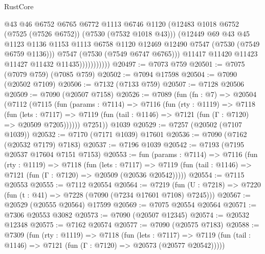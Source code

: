\begin{lexlean}{RustCore}
\begin{coremodule}
                            @43
                            @46
                            @6752
                            @6765
                            @6772
                            @1113
                            @6746
                            @1120
                            (@12483 @1018 @6752 (@7525 (@7526 @6752)) (@7530 (@7532 @1018 @43)))
                            (@12449
                              @69
                              @43
                              @45
                              @1123
                              @1136
                              @1153
                              @1113
                              @6758
                              @1120
                              @12469
                              @12490
                              @7547
                              (@7530 (@7549 @6759 @1136)))
                            @7547
                            (@7530 (@7549 @6747 @6765)))
                          @11417
                          @11420
                          @11423
                          @11427
                          @11432
                          @11435)))))))))))
@20497 := @7073 @759
@20501 := @7075 (@7079 @759) (@7085 @759)
@20502 := @7094 @17598
@20504 := @7090 (@20502 @7109)
@20506 := @7132 (@7133 @759)
@20507 := @7128 @20506
@20509 := @7090 (@20507 @7158)
@20526 := @7089
    (fun (fn : @7) =>
    @20504
      (@7112
        (@7115
          (fun (params : @7114) =>
          @7116
            (fun (rty : @1119) =>
            @7118
              (fun (lets : @7117) =>
              @7119 (fun (tail : @1146) => @7121 (fun (Γ : @7120) => @20509 @7205))))))
        @7251))
    @1039
@20529 := @7257 (@20502 (@7107 @1039))
@20532 := @7170 (@7171 @1039) @17601
@20536 := @7090 (@7162 (@20532 @7179) @7183)
@20537 := @7196 @1039
@20542 := @7193 (@7195 @20537 @17604 @7151 @7153)
@20553 := fun (params : @7114) =>
  @7116
    (fun (rty : @1119) =>
    @7118
      (fun (lets : @7117) =>
      @7119 (fun (tail : @1146) => @7121 (fun (Γ : @7120) => @20509 (@20536 @20542)))))
@20554 := @7115 @20553
@20555 := @7112 @20554
@20564 := @7219
    (fun (U : @7218) => @7220 (fun (t : @41) => @7228 (@7090 (@7234 @17601 @7108) @7245)))
@20567 := @20529 (@20555 @20564) @17599
@20569 := @7075 @20554 @20564
@20571 := @7306 @20553 @3082
@20573 := @7090 (@20507 @12345)
@20574 := @20532 @12348
@20575 := @7162 @20574
@20577 := @7090 (@20575 @7183)
@20588 := @7309
    (fun (rty : @1119) =>
    @7118
      (fun (lets : @7117) =>
      @7119 (fun (tail : @1146) => @7121 (fun (Γ : @7120) => @20573 (@20577 @20542)))))

\end{coremodule}
\end{lexlean}
